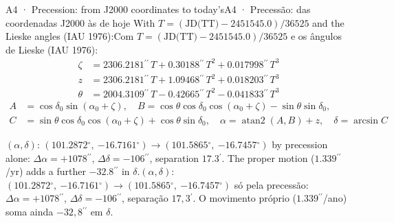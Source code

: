 \documentclass[aspectratio=169,11pt]{beamer}
\newcommand{\tr}[2]{\ifEN#2\else#1\fi}
\newcommand{\asec}{\ensuremath{{}^{\prime\prime}}}
\newcommand{\amin}{\ensuremath{{}^{\prime}}}
\newcommand{\gr}{\ensuremath{{}^{\circ}}}
\begin{document}
\begin{frame}{\tr{A4 · Precessão: das coordenadas J2000 às de hoje}{A4 · Precession: from J2000 coordinates to today's}}
  \footnotesize
  \tr{Com $T = (\text{JD(TT)} - \num{2451545.0})/\num{36525}$ e os ângulos de Lieske (IAU 1976):}{With $T = (\text{JD(TT)} - \num{2451545.0})/\num{36525}$ and the Lieske angles (IAU 1976):}
  \[ \begin{aligned}
     \zeta &= \num{2306.2181}\asec\,T + \num{0.30188}\asec\,T^{2} + \num{0.017998}\asec\,T^{3} \\
     z &= \num{2306.2181}\asec\,T + \num{1.09468}\asec\,T^{2} + \num{0.018203}\asec\,T^{3} \\
     \theta &= \num{2004.3109}\asec\,T - \num{0.42665}\asec\,T^{2} - \num{0.041833}\asec\,T^{3}
     \end{aligned} \]
  \[ \begin{aligned}
     A &= \cos\delta_0 \sin(\alpha_0+\zeta), \quad B = \cos\theta \cos\delta_0 \cos(\alpha_0+\zeta) - \sin\theta \sin\delta_0, \\
     C &= \sin\theta \cos\delta_0 \cos(\alpha_0+\zeta) + \cos\theta \sin\delta_0, \quad \alpha = \operatorname{atan2}(A,B) + z, \quad \delta = \arcsin C
     \end{aligned} \]
  \begin{cuidado}[title={\tr{Exemplo: Sirius, de J2000.0 a 18/10/2026}{Example: Sirius, from J2000.0 to 18 Oct 2026}}]
    \tr{$(\alpha,\delta)$: $(\num{101.2872}\gr,\ \num{-16.7161}\gr) \to (\num{101.5865}\gr,\ \num{-16.7457}\gr)$ só pela precessão: $\Delta\alpha = +1078\asec$, $\Delta\delta = -106\asec$, separação $17{,}3\amin$. O movimento próprio ($\num{1.339}\asec$/ano) soma ainda $-32{,}8\asec$ em $\delta$.}{$(\alpha,\delta)$: $(\num{101.2872}\gr,\ \num{-16.7161}\gr) \to (\num{101.5865}\gr,\ \num{-16.7457}\gr)$ by precession alone: $\Delta\alpha = +1078\asec$, $\Delta\delta = -106\asec$, separation $17.3\amin$. The proper motion ($\num{1.339}\asec$/yr) adds a further $-32.8\asec$ in $\delta$.}
  \end{cuidado}
\end{frame}
\end{document}
